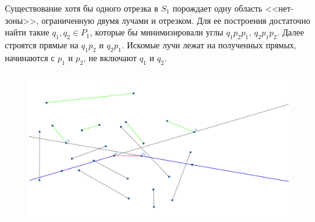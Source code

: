 \documentclass[letterpaper,12pt]{article}
\begin{document}
Существование хотя бы одного отрезка в $S_1$ порождает
одну область <<нет-зоны>>, ограниченную двумя лучами и отрезком.
Для ее построения достаточно найти такие  $q_1, q_2 \in P_1$,
которые бы минимизировали углы $q_1 p_2 p_1$, $q_2 p_1 p_2$.
Далее строятся прямые на $q_1 p_2$ и $q_2 p_1$. Искомые лучи
лежат на полученных прямых, начинаются с $p_1$ и $p_2$, 
не включают $q_1$ и $q_2$.
\begin{figure}[H]
      \centering
      \includegraphics[width=0.5\linewidth]{rays_1.png}
\end{figure}
\end{document}
